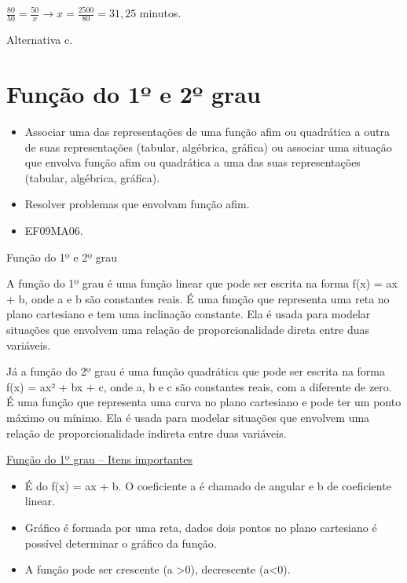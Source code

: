 \begin{escolha}
{{{\begin{escolha}
{\(\frac{80}{50} = \frac{50}{x} \rightarrow x = \frac{2500}{80} = 31,25\)
minutos.

Alternativa c.

\pagestyle{mat}
\chapter{Função do 1º e 2º grau}


\begin{itemize}

  \item Associar uma das representações de uma função afim ou quadrática a
outra de suas representações (tabular, algébrica, gráfica) ou associar uma
situação que envolva função afim ou quadrática a uma das suas
representações (tabular, algébrica, gráfica).
  \item Resolver problemas que envolvam função afim.  

\end{itemize} 


\begin{itemize}
  \item EF09MA06.
\end{itemize}


Função do 1º e 2º grau


A função do 1º grau é uma função linear que pode ser escrita na forma
f(x) = ax + b, onde a e b são constantes reais. É uma função que
representa uma reta no plano cartesiano e tem uma inclinação constante.
Ela é usada para modelar situações que envolvem uma relação de
proporcionalidade direta entre duas variáveis.

Já a função do 2º grau é uma função quadrática que pode ser escrita na
forma f(x) = ax² + bx + c, onde a, b e c são constantes reais, com a
diferente de zero. É uma função que representa uma curva no plano
cartesiano e pode ter um ponto máximo ou mínimo. Ela é usada para
modelar situações que envolvem uma relação de proporcionalidade indireta
entre duas variáveis.

\ul{Função do 1º grau -- Itens importantes}

\begin{itemize}
\item
  É do f(x) = ax + b. O coeficiente a é chamado de angular e b de
  coeficiente linear.
\item
  Gráfico é formada por uma reta, dados dois pontos no plano cartesiano
  é possível determinar o gráfico da função.
\item
  A função pode ser crescente (a \textgreater0), decrescente
  (a\textless0).
\end{itemize}

}
\end{escolha}}}}
\end{escolha}
